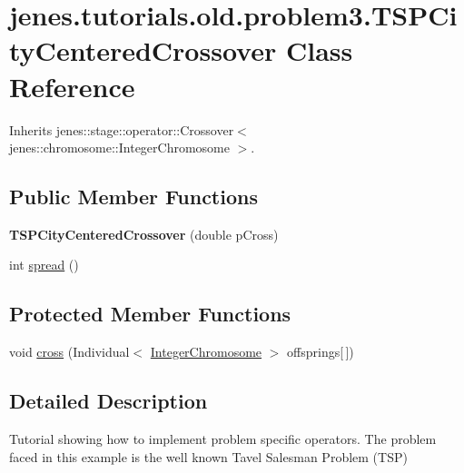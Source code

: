\hypertarget{classjenes_1_1tutorials_1_1old_1_1problem3_1_1_t_s_p_city_centered_crossover}{
\section{jenes.tutorials.old.problem3.TSPCityCenteredCrossover Class Reference}
\label{classjenes_1_1tutorials_1_1old_1_1problem3_1_1_t_s_p_city_centered_crossover}
}
Inherits jenes::stage::operator::Crossover$<$ jenes::chromosome::IntegerChromosome $>$.

\subsection*{Public Member Functions}
\begin{CompactItemize}
\item 
\hypertarget{classjenes_1_1tutorials_1_1old_1_1problem3_1_1_t_s_p_city_centered_crossover_1d89f8d326252c8c65c7abc11e486722}{
\textbf{TSPCityCenteredCrossover} (double pCross)}
\label{classjenes_1_1tutorials_1_1old_1_1problem3_1_1_t_s_p_city_centered_crossover_1d89f8d326252c8c65c7abc11e486722}

\item 
int \hyperlink{classjenes_1_1tutorials_1_1old_1_1problem3_1_1_t_s_p_city_centered_crossover_8e53f91513fd450e8852d22fb5afaf17}{spread} ()
\end{CompactItemize}
\subsection*{Protected Member Functions}
\begin{CompactItemize}
\item 
void \hyperlink{classjenes_1_1tutorials_1_1old_1_1problem3_1_1_t_s_p_city_centered_crossover_d953284beb1ccab1a3eb78c37096a3fa}{cross} (Individual$<$ \hyperlink{classjenes_1_1chromosome_1_1_integer_chromosome}{IntegerChromosome} $>$ offsprings\mbox{[}$\,$\mbox{]})
\end{CompactItemize}


\subsection{Detailed Description}
Tutorial showing how to implement problem specific operators. The problem faced in this example is the well known Tavel Salesman Problem (TSP)

